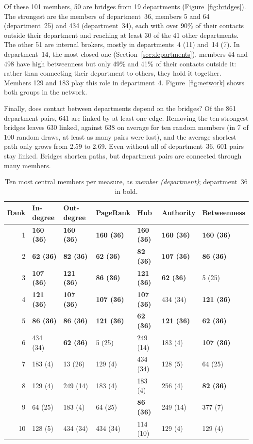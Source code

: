 \documentclass[12pt, a4paper]{article}
\begin{document}
Of these 101 members, 50 are bridges from 19 departments
(Figure~\ref{fig:bridges}). The strongest are the members of department~36,
members 5 and 64 (department~25) and 434 (department~34), each with over 90\%
of their contacts outside their department and reaching at least 30 of the 41
other departments. The other 51 are internal brokers, mostly in departments~4
(11) and~14 (7). In department~14, the most closed one
(Section~\ref{sec:departments}), members 44 and 498 have high betweenness but
only 49\% and 41\% of their contacts outside it: rather than connecting their
department to others, they hold it together. Members 129 and 183 play this role
in department~4. Figure~\ref{fig:network} shows both groups in the network.

Finally, does contact between departments depend on the bridges? Of the 861
department pairs, 641 are linked by at least one edge. Removing the ten
strongest bridges leaves 630 linked, against 638 on average for ten random
members (in 7 of 100 random draws, at least as many pairs were lost), and the
average shortest path only grows from 2.59 to 2.69. Even without all of
department~36, 601 pairs stay linked. Bridges shorten paths, but department
pairs are connected through many members.

\begin{table}[htbp]
\centering
\small
\begin{tabular}{rllllll}
\toprule
Rank & In-degree & Out-degree & PageRank & Hub & Authority & Betweenness \\
\midrule
1 & \textbf{160 (36)} & \textbf{160 (36)} & \textbf{160 (36)} & \textbf{160 (36)} & \textbf{160 (36)} & \textbf{160 (36)} \\
2 & \textbf{62 (36)} & \textbf{82 (36)} & \textbf{62 (36)} & \textbf{82 (36)} & \textbf{107 (36)} & \textbf{86 (36)} \\
3 & \textbf{107 (36)} & \textbf{121 (36)} & \textbf{86 (36)} & \textbf{121 (36)} & \textbf{62 (36)} & 5 (25) \\
4 & \textbf{121 (36)} & \textbf{107 (36)} & \textbf{107 (36)} & \textbf{107 (36)} & 434 (34) & \textbf{121 (36)} \\
5 & \textbf{86 (36)} & \textbf{86 (36)} & \textbf{121 (36)} & \textbf{62 (36)} & \textbf{121 (36)} & \textbf{62 (36)} \\
6 & 434 (34) & \textbf{62 (36)} & 5 (25) & 249 (14) & 183 (4) & \textbf{107 (36)} \\
7 & 183 (4) & 13 (26) & 129 (4) & 434 (34) & 128 (5) & 64 (25) \\
8 & 129 (4) & 249 (14) & 183 (4) & 183 (4) & 256 (4) & \textbf{82 (36)} \\
9 & 64 (25) & 183 (4) & 64 (25) & \textbf{86 (36)} & 249 (14) & 377 (7) \\
10 & 128 (5) & 434 (34) & 434 (34) & 114 (10) & 129 (4) & 129 (4) \\
\bottomrule
\end{tabular}
\caption{Ten most central members per measure, as \emph{member
(department)}; department~36 in bold.}
\label{tab:top10}
\end{table}
\end{document}
